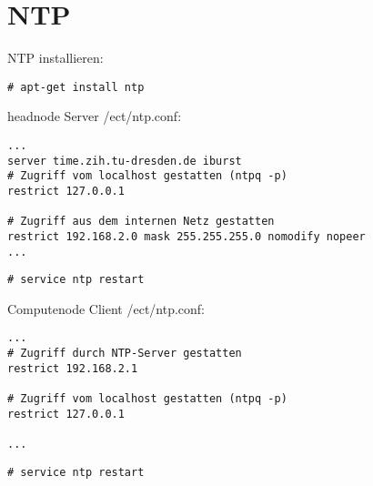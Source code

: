 \chapter{NTP}
NTP installieren:
\begin{lstlisting}[style=Bash]
# apt-get install ntp
\end{lstlisting}
headnode Server /ect/ntp.conf:
\begin{lstlisting}[style=Bash]
...
server time.zih.tu-dresden.de iburst
# Zugriff vom localhost gestatten (ntpq -p)
restrict 127.0.0.1
 
# Zugriff aus dem internen Netz gestatten
restrict 192.168.2.0 mask 255.255.255.0 nomodify nopeer
...
\end{lstlisting}
\begin{lstlisting}[style=Bash]
# service ntp restart
\end{lstlisting}
Computenode Client /ect/ntp.conf:
\begin{lstlisting}[style=Bash]
...
# Zugriff durch NTP-Server gestatten
restrict 192.168.2.1
 
# Zugriff vom localhost gestatten (ntpq -p)
restrict 127.0.0.1
 
...
\end{lstlisting}
\begin{lstlisting}[style=Bash]
# service ntp restart
\end{lstlisting}
